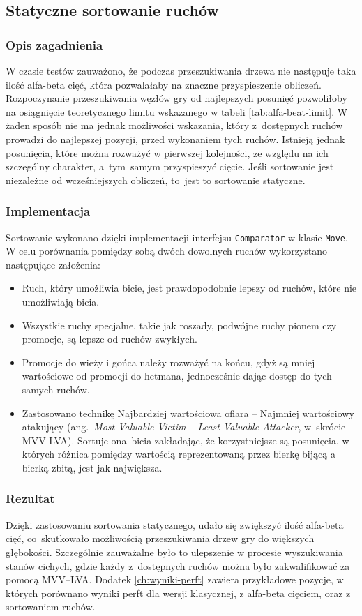 \subsection{Statyczne sortowanie ruchów}
\label{subsec:sortowanie-ruchow}

\subsubsection{Opis zagadnienia}
W czasie testów zauważono, że podczas przeszukiwania drzewa nie następuje taka ilość alfa-beta cięć, która pozwalałaby na znaczne przyspieszenie obliczeń.
Rozpoczynanie przeszukiwania węzłów gry od najlepszych posunięć pozwoliłoby na osiągnięcie teoretycznego limitu wskazanego w tabeli \ref{tab:alfa-beat-limit}.
W żaden sposób nie ma jednak możliwości wskazania, który z~dostępnych ruchów prowadzi do najlepszej pozycji, przed wykonaniem tych ruchów.
Istnieją jednak posunięcia, które można rozważyć w pierwszej kolejności, ze względu na ich szczególny charakter, a~tym~samym przyspieszyć cięcie.
Jeśli sortowanie jest niezależne od wcześniejszych obliczeń, to~jest to sortowanie statyczne.

\subsubsection{Implementacja}
Sortowanie wykonano dzięki implementacji interfejsu \texttt{Comparator} w klasie \texttt{Move}.
W celu porównania pomiędzy sobą dwóch dowolnych ruchów wykorzystano następujące założenia:
\begin{itemize}
    \item Ruch, który umożliwia bicie, jest prawdopodobnie lepszy od ruchów, które nie umożliwiają bicia.
    \item Wszystkie ruchy specjalne, takie jak roszady, podwójne ruchy pionem czy promocje, są lepsze od ruchów zwykłych.
    \item Promocje do wieży i gońca należy rozważyć na końcu, gdyż są mniej wartościowe od promocji do hetmana, jednocześnie dając dostęp do tych samych ruchów.
    \item Zastosowano technikę Najbardziej wartościowa ofiara – Najmniej wartościowy atakujący (ang.~\emph{Most Valuable Victim – Least Valuable Attacker}, w~skrócie MVV-LVA). Sortuje ona~bicia zakładając, że korzystniejsze są posunięcia, w których różnica pomiędzy wartością reprezentowaną przez bierkę bijącą a bierką zbitą, jest jak największa.
\end{itemize}

\subsubsection{Rezultat}
Dzięki zastosowaniu sortowania statycznego, udało się zwiększyć ilość alfa-beta cięć, co~skutkowało możliwością przeszukiwania drzew gry do większych głębokości.
Szczególnie zauważalne było to ulepszenie w procesie wyszukiwania stanów cichych, gdzie każdy z~dostępnych ruchów można było zakwalifikować za pomocą MVV–LVA.
Dodatek \ref{ch:wyniki-perft} zawiera przykładowe pozycje, w których porównano wyniki perft dla wersji klasycznej, z alfa-beta cięciem, oraz z sortowaniem ruchów.
